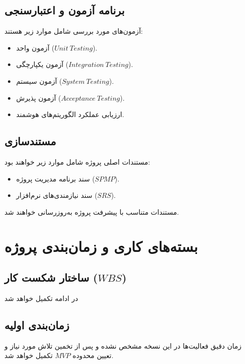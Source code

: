 \documentclass[12pt,a4paper]{article}
\begin{document}
	\subsection{برنامه آزمون و اعتبارسنجی}
	
	آزمون‌های مورد بررسی شامل موارد زیر هستند:
	
	\begin{itemize}
		\item آزمون واحد ($Unit\ Testing$).
		\item آزمون یکپارچگی ($Integration\ Testing$).
		\item آزمون سیستم ($System\ Testing$).
		\item آزمون پذیرش ($Acceptance\ Testing$).
		\item ارزیابی عملکرد الگوریتم‌های هوشمند.
	\end{itemize}
	
	\subsection{مستندسازی}
	
	مستندات اصلی پروژه شامل موارد زیر خواهند بود:
	
	\begin{itemize}
		\item سند برنامه مدیریت پروژه ($SPMP$).
		\item سند نیازمندی‌های نرم‌افزار ($SRS$).
	\end{itemize}
	
	مستندات متناسب با پیشرفت پروژه
	به‌روزرسانی خواهند شد.
	
	
	\section{بسته‌های کاری و زمان‌بندی پروژه}
	
	\subsection{ساختار شکست کار ($WBS$)}
	
	در ادامه تکمیل خواهد شد
	
	\subsection{زمان‌بندی اولیه}
	
	زمان دقیق فعالیت‌ها در این نسخه مشخص نشده
	و پس از تخمین تلاش مورد نیاز و تعیین
	محدوده $MVP$ تکمیل خواهد شد.
	
\end{document}
